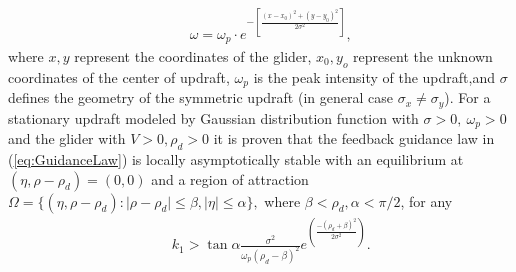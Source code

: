 \documentclass{ifacconf}
\begin{document}
\begin{eqnarray}
    && \omega=\omega_p \cdot e^{-[\frac{(x-x_0)^2+(y-y_0)^2}{2\sigma^2}]},
    \label{eq:GaussUpdraft}
\end{eqnarray}
where $x, y$ represent the coordinates of the glider, $x_0, y_o$ represent the unknown coordinates of the center of updraft, $\omega_p$ is the peak intensity of the updraft,and $\sigma$ defines the geometry of the symmetric updraft (in general case $\sigma_x \neq \sigma_y$). For a stationary updraft modeled by Gaussian distribution function with $\sigma>0,~\omega_p>0$ and the glider with $V>0, \rho_d>0$ it is proven that the feedback guidance law in (\ref{eq:GuidanceLaw}) is locally asymptotically stable with an equilibrium at $(\eta, \rho-\rho_d)=(0,0)$ and a region of attraction $\Omega=\{(\eta, \rho-\rho_d): \vert \rho-\rho_d \vert \leq \beta,  \vert \eta \vert \leq \alpha \}, $ where $\beta < \rho_d, \alpha< \pi/2$, for any
\begin{eqnarray}
    && k_1 > \tan \alpha \frac{\sigma^2}{\omega_p(\rho_d-\beta)^2} e^(\frac{-(\rho_d+\beta)^2}{2\sigma^2} ).\nonumber
    \label{eq:GuidanceGain}
\end{eqnarray}


\end{document}
